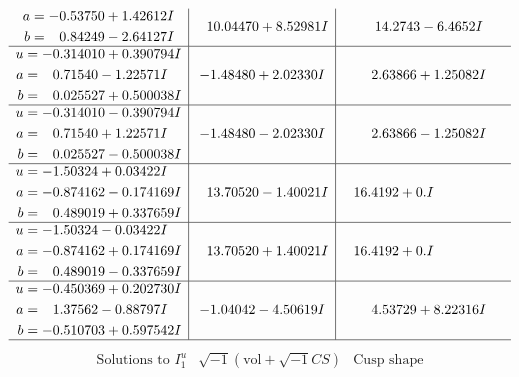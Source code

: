 \documentclass[1p]{elsarticle_modified}
\theoremstyle{definition}
\newcommand{\I}{\sqrt{-1}}
\begin{document}
$$\begin{array}{c|c|c}
\begin{aligned}
a &= -0.53750 + 1.42612 I \\
b &= \phantom{-}0.84249 - 2.64127 I\end{aligned}
 & \phantom{-}10.04470 + 8.52981 I & \phantom{-}14.2743 - 6.4652 I \\ \hline\begin{aligned}
u &= -0.314010 + 0.390794 I \\
a &= \phantom{-}0.71540 - 1.22571 I \\
b &= \phantom{-}0.025527 + 0.500038 I\end{aligned}
 & -1.48480 + 2.02330 I & \phantom{-}2.63866 + 1.25082 I \\ \hline\begin{aligned}
u &= -0.314010 - 0.390794 I \\
a &= \phantom{-}0.71540 + 1.22571 I \\
b &= \phantom{-}0.025527 - 0.500038 I\end{aligned}
 & -1.48480 - 2.02330 I & \phantom{-}2.63866 - 1.25082 I \\ \hline\begin{aligned}
u &= -1.50324 + 0.03422 I \\
a &= -0.874162 - 0.174169 I \\
b &= \phantom{-}0.489019 + 0.337659 I\end{aligned}
 & \phantom{-}13.70520 - 1.40021 I & \phantom{-}16.4192 + 0. I\phantom{ +0.000000I} \\ \hline\begin{aligned}
u &= -1.50324 - 0.03422 I \\
a &= -0.874162 + 0.174169 I \\
b &= \phantom{-}0.489019 - 0.337659 I\end{aligned}
 & \phantom{-}13.70520 + 1.40021 I & \phantom{-}16.4192 + 0. I\phantom{ +0.000000I} \\ \hline\begin{aligned}
u &= -0.450369 + 0.202730 I \\
a &= \phantom{-}1.37562 - 0.88797 I \\
b &= -0.510703 + 0.597542 I\end{aligned}
 & -1.04042 - 4.50619 I & \phantom{-}4.53729 + 8.22316 I\\
 \hline 
 \end{array}$$\newpage$$\begin{array}{c|c|c}  
\text{Solutions to }I^u_{1}& \I (\text{vol} + \sqrt{-1}CS) & \text{Cusp shape}\\
 \hline 
\begin{aligned}

\end{aligned}
\end{array}$$
\end{document}
